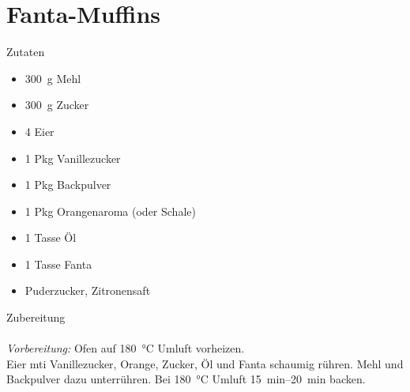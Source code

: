 \section*{Fanta-Muffins}
\ihead{}\ohead{}
\cfoot{}
{\Large Zutaten}
\begin{multicols}{2}
\begin{itemize}
    \item \SI{300}{g} Mehl
    \item \SI{300}{g} Zucker
    \item \num{4} Eier
    \item \num{1} Pkg Vanillezucker
    \item \num{1} Pkg Backpulver
    \item \num{1} Pkg Orangenaroma (oder Schale)
    \item \num{1} Tasse Öl
    \item \num{1} Tasse Fanta
    \item Puderzucker, Zitronensaft
\end{itemize}
\end{multicols}
\noindent
{\Large Zubereitung}\\
\\
\textit{Vorbereitung:} Ofen auf \SI{180}{\celsius} Umluft vorheizen.\\
Eier mti Vanillezucker, Orange, Zucker, Öl und Fanta schaumig rühren.
Mehl und Backpulver dazu unterrühren. 
Bei \SI{180}{\celsius} Umluft \SIrange{15}{20}{min} backen.